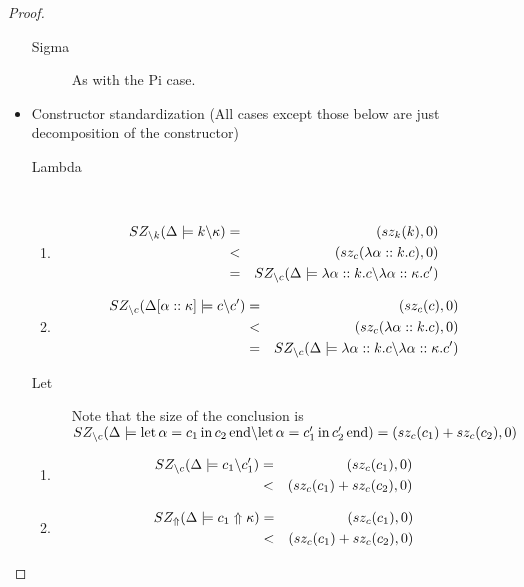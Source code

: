 \documentclass[12pt,twoside,fleqn]{amsart}
\theoremstyle{plain}
\theoremstyle{plain}
\theoremstyle{definition}
\begin{document}
\begin{proof}
\begin{itemize}
\begin{enumerate}
\end{enumerate}
\begin{description}
\item [Sigma]As with the Pi case.
\end{description}
\item Constructor standardization (All cases except those below are just decomposition
of the constructor)

\begin{description}
\item [Lambda]~
\end{description}
\begin{enumerate}
\item 
\begin{eqnarray*}
SZ_{\backslash k}(\Delta   \models k  \backslash \kappa   ) & = & (sz_k(k),0)\\
 & < & (sz_{c}(\lambda \alpha  ::k .c ),0)\\
 & = & SZ_{\backslash c}(\Delta   \models \lambda \alpha  ::k .c  \backslash \lambda \alpha  ::\kappa  .c'  )
\end{eqnarray*}

\item 
\begin{eqnarray*}
SZ_{\backslash c}(\Delta  [\alpha   ::\kappa   ]  \models c  \backslash c'  ) & = & (sz_{c}(c ),0)\\
 & < & (sz_{c}(\lambda \alpha  ::k .c ),0)\\
 & = & SZ_{\backslash c}(\Delta   \models \lambda \alpha  ::k .c  \backslash \lambda \alpha  ::\kappa  .c'  )
\end{eqnarray*}

\end{enumerate}
\begin{description}
\item [Let]Note that the size of the conclusion is \( SZ_{\backslash c}(\Delta   \models \mathrm{let}\, \alpha  =c_{1} \, \mathrm{in}\, c_{2} \, \mathrm{end}  \backslash \mathrm{let}\, \alpha  =c_{1}' \, \mathrm{in}\, c_{2}' \, \mathrm{end}  )=(sz_{c}(c_{1} )+sz_{c}(c_{2} ),0) \)
\end{description}
\begin{enumerate}
\item 
\begin{eqnarray*}
SZ_{\backslash c}(\Delta   \models c_{1}  \backslash c_{1}'  ) & = & (sz_{c}(c_{1} ),0)\\
 & < & (sz_{c}(c_{1} )+sz_{c}(c_{2} ),0)
\end{eqnarray*}
 
\item 
\begin{eqnarray*}
SZ_{\Uparrow }(\Delta   \models c_{1}  \Uparrow \kappa   ) & = & (sz_{c}(c_{1} ),0)\\
 & < & (sz_{c}(c_{1} )+sz_{c}(c_{2} ),0)
\end{eqnarray*}


\end{enumerate}
\end{itemize}
\end{proof}
\end{document}
